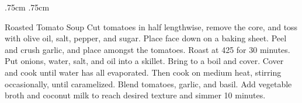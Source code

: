\documentclass[]{article}
\title{}
\author{}
\begin{document}
\RecipeWidths{\textwidth}{3cm}{0.5cm}{5cm} {.75cm} {.75cm}
\begin{recipe}{Roasted Tomato Soup}{}{}	
	Cut tomatoes in half lengthwise, remove the core, and toss with olive oil, salt, pepper, and sugar. Place face down on a baking sheet. 
	Peel and crush garlic, and place amongst the tomatoes. Roast at 425 for 30 minutes. 
	Put onions, water, salt, and oil into a skillet. Bring to a boil and cover. Cover and cook until water has all evaporated. Then cook on medium heat, stirring occasionally, until caramelized. 
	Blend tomatoes, garlic, and basil. Add vegetable broth and coconut milk to reach desired texture and simmer 10 minutes.
\end{recipe}
\end{document}
